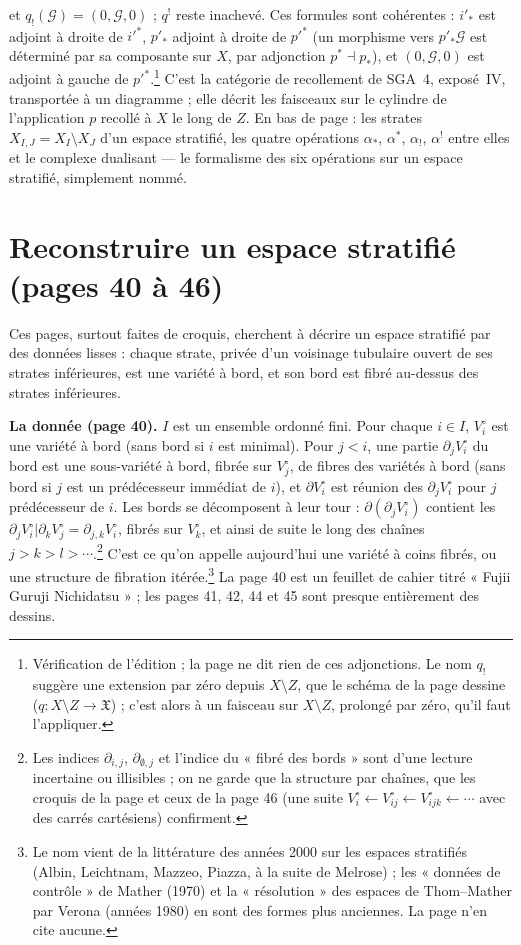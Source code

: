 \documentclass[11pt,a4paper]{article}
\begin{document}
et $q_{!}(\mathcal{G}) = (0, \mathcal{G}, 0)$ ; $q^{!}$ reste inachevé. Ces
formules sont cohérentes : $i'_*$ est adjoint à droite de $i'^*$, $p'_*$ adjoint
à droite de $p'^*$ (un morphisme vers $p'_*\mathcal{G}$ est déterminé par sa
composante sur $X$, par adjonction $p^* \dashv p_*$), et $(0, \mathcal{G}, 0)$
est adjoint à gauche de $p'^*$.\footnote{Vérification de l'édition ; la page ne
dit rien de ces adjonctions. Le nom $q_!$ suggère une extension par zéro depuis
$X \setminus Z$, que le schéma de la page dessine ($q : X \setminus Z \to
\mathfrak{X}$) ; c'est alors à un faisceau sur $X \setminus Z$, prolongé par
zéro, qu'il faut l'appliquer.} C'est la catégorie de recollement de SGA~4,
exposé~IV, transportée à un diagramme ; elle décrit les faisceaux sur le
cylindre de l'application $p$ recollé à $X$ le long de $Z$. En bas de page :
les strates $X_{I,J} = X_I \setminus X_J$ d'un espace stratifié, les quatre
opérations $\alpha_*$, $\alpha^*$, $\alpha_!$, $\alpha^!$ entre elles et le
complexe dualisant — le formalisme des six opérations sur un espace stratifié,
simplement nommé.

\section*{Reconstruire un espace stratifié (pages 40 à 46)}

Ces pages, surtout faites de croquis, cherchent à décrire un espace stratifié
par des données lisses : chaque strate, privée d'un voisinage tubulaire
ouvert de ses strates inférieures, est une variété à bord, et son bord est
fibré au-dessus des strates inférieures.

\textbf{La donnée (page 40).} $I$ est un ensemble ordonné fini. Pour chaque
$i \in I$, $V_i^{\circ}$ est une variété à bord (sans bord si $i$ est
minimal). Pour $j < i$, une partie $\partial_j V_i^{\circ}$ du bord est une
sous-variété à bord, fibrée sur $V_j^{\circ}$, de fibres des variétés à bord
(sans bord si $j$ est un prédécesseur immédiat de $i$), et $\partial
V_i^{\circ}$ est réunion des $\partial_j V_i^{\circ}$ pour $j$ prédécesseur
de $i$. Les bords se décomposent à leur tour : $\partial(\partial_j V_i^\circ)$
contient les $\partial_j V_i^\circ | \partial_k V_j^\circ = \partial_{j,k}
V_i^\circ$, fibrés sur $V_k^\circ$, et ainsi de suite le long des chaînes
$j > k > l > \cdots$.\footnote{Les indices $\partial_{i,j}$,
$\partial_{\emptyset,j}$ et l'indice du « fibré des bords » sont d'une lecture
incertaine ou illisibles ; on ne garde que la structure par chaînes, que les
croquis de la page et ceux de la page 46 (une suite $V_i^{\circ} \leftarrow
V_{ij}^{\circ} \leftarrow V_{ijk}^{\circ} \leftarrow \cdots$ avec des carrés
cartésiens) confirment.} C'est ce qu'on appelle aujourd'hui une variété à
coins fibrés, ou une structure de fibration itérée.\footnote{Le nom vient de la
littérature des années 2000 sur les espaces stratifiés (Albin, Leichtnam,
Mazzeo, Piazza, à la suite de Melrose) ; les « données de contrôle » de Mather
(1970) et la « résolution » des espaces de Thom–Mather par Verona (années 1980)
en sont des formes plus anciennes. La page n'en cite aucune.} La page 40 est
un feuillet de cahier titré « Fujii Guruji Nichidatsu » ; les pages 41, 42, 44
et 45 sont presque entièrement des dessins.
\end{document}
